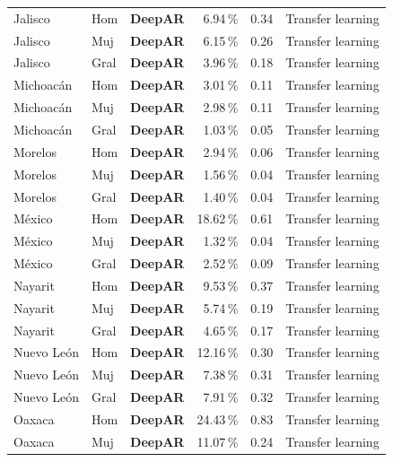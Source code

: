 \documentclass[12pt, letterpaper]{article}
\begin{document}
\begin{longtable}{l l >{\bfseries}c r r l}
Jalisco & Hom & \textcolor{cdeepar}{\textbf{DeepAR}} & 6.94\,\% & 0.34 & Transfer learning \\
Jalisco & Muj & \textcolor{cdeepar}{\textbf{DeepAR}} & 6.15\,\% & 0.26 & Transfer learning \\
Jalisco & Gral & \textcolor{cdeepar}{\textbf{DeepAR}} & 3.96\,\% & 0.18 & Transfer learning \\
Michoacán & Hom & \textcolor{cdeepar}{\textbf{DeepAR}} & 3.01\,\% & 0.11 & Transfer learning \\
Michoacán & Muj & \textcolor{cdeepar}{\textbf{DeepAR}} & 2.98\,\% & 0.11 & Transfer learning \\
Michoacán & Gral & \textcolor{cdeepar}{\textbf{DeepAR}} & 1.03\,\% & 0.05 & Transfer learning \\
Morelos & Hom & \textcolor{cdeepar}{\textbf{DeepAR}} & 2.94\,\% & 0.06 & Transfer learning \\
Morelos & Muj & \textcolor{cdeepar}{\textbf{DeepAR}} & 1.56\,\% & 0.04 & Transfer learning \\
Morelos & Gral & \textcolor{cdeepar}{\textbf{DeepAR}} & 1.40\,\% & 0.04 & Transfer learning \\
México & Hom & \textcolor{cdeepar}{\textbf{DeepAR}} & 18.62\,\% & 0.61 & Transfer learning \\
México & Muj & \textcolor{cdeepar}{\textbf{DeepAR}} & 1.32\,\% & 0.04 & Transfer learning \\
México & Gral & \textcolor{cdeepar}{\textbf{DeepAR}} & 2.52\,\% & 0.09 & Transfer learning \\
Nayarit & Hom & \textcolor{cdeepar}{\textbf{DeepAR}} & 9.53\,\% & 0.37 & Transfer learning \\
Nayarit & Muj & \textcolor{cdeepar}{\textbf{DeepAR}} & 5.74\,\% & 0.19 & Transfer learning \\
Nayarit & Gral & \textcolor{cdeepar}{\textbf{DeepAR}} & 4.65\,\% & 0.17 & Transfer learning \\
Nuevo León & Hom & \textcolor{cdeepar}{\textbf{DeepAR}} & 12.16\,\% & 0.30 & Transfer learning \\
Nuevo León & Muj & \textcolor{cdeepar}{\textbf{DeepAR}} & 7.38\,\% & 0.31 & Transfer learning \\
Nuevo León & Gral & \textcolor{cdeepar}{\textbf{DeepAR}} & 7.91\,\% & 0.32 & Transfer learning \\
Oaxaca & Hom & \textcolor{cdeepar}{\textbf{DeepAR}} & 24.43\,\% & 0.83 & Transfer learning \\
Oaxaca & Muj & \textcolor{cdeepar}{\textbf{DeepAR}} & 11.07\,\% & 0.24 & Transfer learning \\

\end{longtable}
\end{document}
